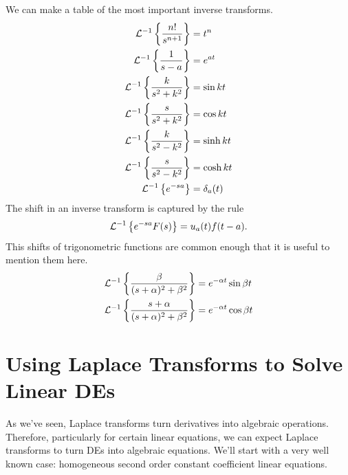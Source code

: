 \documentclass[fleqn,letterpaper]{report}
\begin{document}
We can make a table of the most important inverse transforms.
\begin{align*}
\mathcal{L}^{-1} \left\{ \frac{n!}{s^{n+1}} \right\} & = t^n \\
\mathcal{L}^{-1} \left\{ \frac{1}{s-a} \right\} & = e^{at} \\
\mathcal{L}^{-1} \left\{ \frac{k}{s^2 + k^2} \right\} & = \sin kt \\
\mathcal{L}^{-1} \left\{ \frac{s}{s^2 + k^2} \right\} & = \cos kt \\
\mathcal{L}^{-1} \left\{ \frac{k}{s^2 - k^2} \right\} & = \sinh kt \\
\mathcal{L}^{-1} \left\{ \frac{s}{s^2 -k^2} \right\} & = \cosh kt \\
\mathcal{L}^{-1} \left\{ e^{-sa} \right\} & = \delta_a(t)
\end{align*} 
The shift in an inverse transform is captured by the rule 
\begin{equation*}
\mathcal{L}^{-1} \left\{ e^{-sa} F(s) \right\} = u_a(t) f(t-a).
\end{equation*}
This shifts of trigonometric functions are common enough that
it is useful to mention them here.
\begin{align*}
\mathcal{L}^{-1} \left\{ \frac{\beta}{(s+ \alpha)^2 + \beta^2}
\right\} & = e^{-\alpha t} \sin \beta t \\
\mathcal{L}^{-1} \left\{ \frac{s + \alpha}{(s+ \alpha)^2 + \beta^2}
\right\} & = e^{-\alpha t} \cos \beta t 
\end{align*}

\section{Using Laplace Transforms to Solve Linear DEs}
\label{laplace-linear-odes}

As we've seen, Laplace transforms turn derivatives into
algebraic operations. Therefore, particularly for certain
linear equations, we can expect Laplace transforms to turn DEs
into algebraic equations. We'll start with a very well known
case: homogeneous second order constant coefficient linear
equations. 
\end{document}
